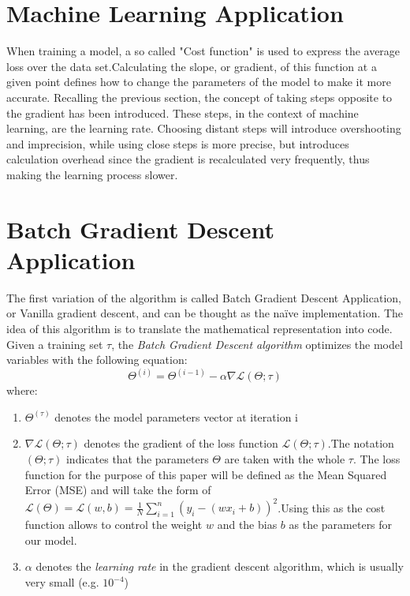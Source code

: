 \documentclass[english]{lni}
\begin{document}
\section{Machine Learning Application}
When training a model, a so called "Cost function" is used to express the average loss over the data set.Calculating the slope, or gradient, of this function at a given point defines how to change the parameters of the model to make it more accurate. Recalling the previous section, the concept of taking steps opposite to the gradient has been introduced. These steps, in the context of machine learning, are the learning rate. Choosing distant steps will introduce overshooting and imprecision, while using close steps is more precise, but introduces calculation overhead since the gradient is recalculated very frequently, thus making the learning process slower. \cite{MLGl}
\section{Batch Gradient Descent Application}
The first variation of the algorithm is called Batch Gradient Descent Application, or Vanilla gradient descent, and can be thought as the naïve implementation. 
The idea of this algorithm is to translate the mathematical representation into code. 
Given a training set $\tau$, the \textit{Batch Gradient Descent algorithm} optimizes the model variables with the following equation:
\begin{equation}
    \Theta^{(i)} = \Theta^{(i-1)} - \alpha\nabla\mathscr{L}(\Theta;\tau)\label{BGDA}
\end{equation}
where:
\begin{enumerate}
  \item $\Theta^{(\tau)}$ denotes the model parameters vector at iteration i
  \item $\nabla\mathscr{L}(\Theta;\tau)$ denotes the gradient of the loss function $\mathscr{L}(\Theta;\tau)$.The notation $(\Theta;\tau)$ indicates that the parameters $\Theta$ are taken with the whole $\tau$. The loss function for the purpose of this paper will be defined as the Mean Squared Error (MSE) and will take the form of $\mathscr{L}(\Theta)=\mathscr{L}(w,b) = \frac{1}{N}\sum_{i=1}^{n}(y_i - (wx_i+b))^2$.Using this as the cost function allows to control the weight $w$ and the bias $b$ as the parameters for our model. 
  \item $\alpha$ denotes the  \textit{learning rate} in the gradient descent algorithm, which is usually very small (e.g. $10^{-4}$)
\end{enumerate}
\end{document}
